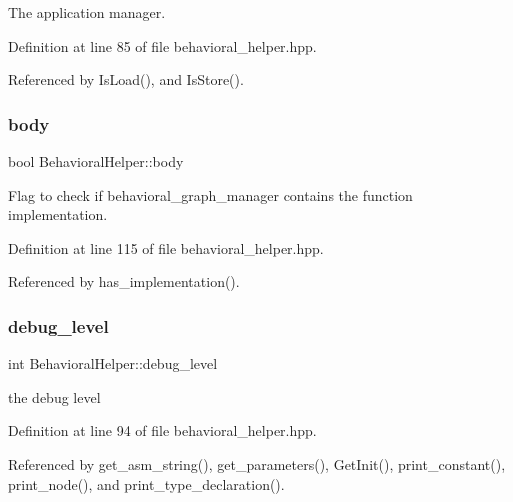 The application manager. 



Definition at line 85 of file behavioral\+\_\+helper.\+hpp.



Referenced by Is\+Load(), and Is\+Store().

\mbox{\label{classBehavioralHelper_a6692a8e5606563e9a6f7a021f91b53aa}} 
\subsubsection{\texorpdfstring{body}{body}}
{\footnotesize\ttfamily bool Behavioral\+Helper\+::body\hspace{0.3cm}{\ttfamily [protected]}}



Flag to check if behavioral\+\_\+graph\+\_\+manager contains the function implementation. 



Definition at line 115 of file behavioral\+\_\+helper.\+hpp.



Referenced by has\+\_\+implementation().

\mbox{\label{classBehavioralHelper_a4b82310260e0b6adc2982298ebd8b006}} 
\subsubsection{\texorpdfstring{debug\+\_\+level}{debug\_level}}
{\footnotesize\ttfamily int Behavioral\+Helper\+::debug\+\_\+level\hspace{0.3cm}{\ttfamily [protected]}}



the debug level 



Definition at line 94 of file behavioral\+\_\+helper.\+hpp.



Referenced by get\+\_\+asm\+\_\+string(), get\+\_\+parameters(), Get\+Init(), print\+\_\+constant(), print\+\_\+node(), and print\+\_\+type\+\_\+declaration().

